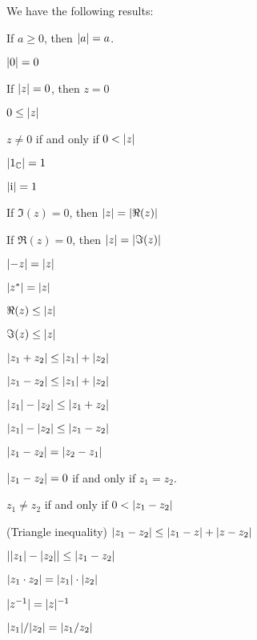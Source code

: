 \documentclass{article}
\begin{document}
We have the following results:
\begin{thm}
\item\label{complex1:43} If $a\geq0$, then $\lvert a\rvert=a$.
\item\label{complex1:44} $\lvert0\rvert=0$
\item\label{complex1:45} If $\lvert z\rvert=0$, then $z=0$
\item\label{complex1:46} $0\leq\lvert z\rvert$
\item\label{complex1:47} $z\neq0$ if and only if $0<\lvert z\rvert$
\item\label{complex1:48} $\lvert1_{\mathbb{C}}\rvert=1$
\item\label{complex1:49} $\lvert\mathrm{i}\rvert=1$
\item\label{complex1:50} If $\Im(z)=0$, then $\lvert z\rvert=\lvert\Re(z)\rvert$
\item\label{complex1:51} If $\Re(z)=0$, then $\lvert z\rvert=\lvert\Im(z)\rvert$
\item\label{complex1:52} $\lvert-z\rvert=\lvert z\rvert$
\item\label{complex1:53} $\lvert z^{*}\rvert=\lvert z\rvert$
\item\label{complex1:54} $\Re(z)\leq\lvert z\rvert$
\item\label{complex1:55} $\Im(z)\leq\lvert z\rvert$
\item\label{complex1:56} $\lvert z_{1}+z_{2}\rvert\leq\lvert z_{1}\rvert+\lvert z_{2}\rvert$
\item\label{complex1:57} $\lvert z_{1}-z_{2}\rvert\leq\lvert z_{1}\rvert+\lvert z_{2}\rvert$
\item\label{complex1:58} $\lvert z_{1}\rvert-\lvert z_{2}\rvert\leq\lvert z_{1}+z_{2}\rvert$
\item\label{complex1:59} $\lvert z_{1}\rvert-\lvert z_{2}\rvert\leq\lvert z_{1}-z_{2}\rvert$
\item\label{complex1:60} $\lvert z_{1}-z_{2}\rvert=\lvert z_{2}-z_{1}\rvert$
\item\label{complex1:61} $\lvert z_{1}-z_{2}\rvert=0$ if and only if $z_{1}=z_{2}$.
\item\label{complex1:62} $z_{1}\neq z_{2}$ if and only if $0<\lvert z_{1}-z_{2}\rvert$
\item\label{complex1:63} (Triangle inequality) $\lvert z_{1}-z_{2}\rvert\leq\lvert z_{1}-z\rvert+\lvert z-z_{2}\rvert$
\item\label{complex1:64} $\lvert\lvert z_{1}\rvert-\lvert z_{2}\rvert\rvert\leq\lvert z_{1}-z_{2}\rvert$
\item\label{complex1:65} $\lvert z_{1}\cdot z_{2}\rvert=\lvert z_{1}\rvert\cdot\lvert z_{2}\rvert$
\item\label{complex1:66} $\lvert z^{-1}\rvert=\lvert z\rvert^{-1}$
\item\label{complex1:67} $\lvert z_{1}\rvert/\lvert z_{2}\rvert=\lvert z_{1}/z_{2}\rvert$

\end{thm}
\end{document}
